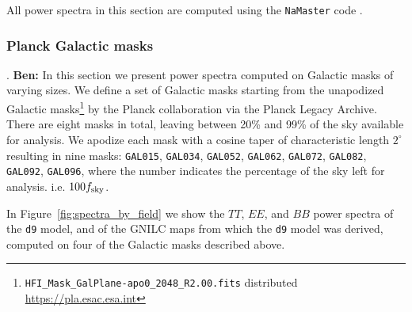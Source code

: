 \documentclass[twocolumn]{aastex631}
\newcommand{\dnine}{{\tt d9}}
\begin{document}
All power spectra in this section are computed using the {\tt NaMaster} code \citep{Alonso:2019}. 

\subsubsection{Planck Galactic masks} \label{sec:galactic_spectra}

.
\textbf{Ben:} In this section we present power spectra computed on Galactic masks of varying sizes. We define a set of Galactic masks starting from the unapodized Galactic masks\footnote{\texttt{HFI\_Mask\_GalPlane-apo0\_2048\_R2.00.fits} distributed \url{https://pla.esac.esa.int}} by the Planck collaboration via the Planck Legacy Archive. There are eight masks in total, leaving between 20\% and 99\% of the sky available for analysis. We apodize each mask with a cosine taper of characteristic length $2^\circ$ resulting in nine masks: \texttt{GAL015}, \texttt{GAL034}, \texttt{GAL052}, \texttt{GAL062}, \texttt{GAL072}, \texttt{GAL082}, \texttt{GAL092}, \texttt{GAL096}, where the number indicates the percentage of the sky left for analysis. i.e. $100 f_{\rm sky}$.  

In Figure~\ref{fig:spectra_by_field} we show the $TT$, $EE$, and $BB$ power spectra of the \dnine{} model, and of the GNILC maps from which the \dnine{} model was derived, computed on four of the Galactic masks described above.
\end{document}
